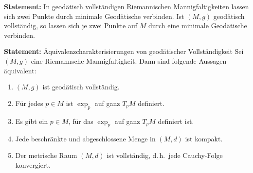 \documentclass[10pt, letterpaper]{article}
\begin{document}
\vspace{0.8cm}




\textbf{Statement: }{In geodätisch vollständigen Riemannischen Mannigfaltigkeiten lassen sich zwei Punkte durch minimale Geodätische verbinden}.
Ist $(M, g)$ geodätisch vollständig, so lassen sich je zwei Punkte auf $M$ durch eine minimale Geodätische verbinden.


\vspace{0.8cm}




\textbf{Statement: }{Äquivalenzcharakterisierungen von geodätischer Vollständigkeit}
Sei $(M, g)$ eine Riemannsche Mannigfaltigkeit. Dann sind folgende Aussagen äquivalent:
\begin{enumerate}
  \item $(M, g)$ ist geodätisch vollständig.
  \item Für jedes $p \in M$ ist $\exp_{p}$ auf ganz $T_p M$ definiert.
  \item Es gibt ein $p \in M$, für das $\exp_{p}$ auf ganz $T_p M$ definiert ist.
  \item Jede beschränkte und abgeschlossene Menge in $(M, d)$ ist kompakt.
  \item Der metrische Raum $(M, d)$ ist vollständig, d.\,h.\ jede Cauchy-Folge konvergiert.
\end{enumerate}
\end{document}
